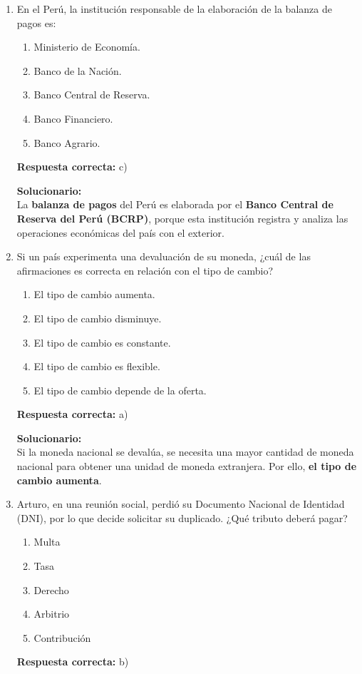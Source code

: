 \begin{enumerate}
	
	\item En el Perú, la institución responsable de la elaboración de la balanza de pagos es:
	\begin{enumerate}[label=\alph*)]
		\item Ministerio de Economía.
		\item Banco de la Nación.
		\item Banco Central de Reserva.
		\item Banco Financiero.
		\item Banco Agrario.
	\end{enumerate}
	\textbf{Respuesta correcta:} c)
	
	\vspace{2mm}
	\textbf{Solucionario:}\\
	La \textbf{balanza de pagos} del Perú es elaborada por el \textbf{Banco Central de Reserva del Perú (BCRP)}, porque esta institución registra y analiza las operaciones económicas del país con el exterior.
	
	\vspace{6mm}
	
	\item Si un país experimenta una devaluación de su moneda, ¿cuál de las afirmaciones es correcta en relación con el tipo de cambio?
	\begin{enumerate}[label=\alph*)]
		\item El tipo de cambio aumenta.
		\item El tipo de cambio disminuye.
		\item El tipo de cambio es constante.
		\item El tipo de cambio es flexible.
		\item El tipo de cambio depende de la oferta.
	\end{enumerate}
	\textbf{Respuesta correcta:} a)
	
	\vspace{2mm}
	\textbf{Solucionario:}\\
	Si la moneda nacional se devalúa, se necesita una mayor cantidad de moneda nacional para obtener una unidad de moneda extranjera. Por ello, \textbf{el tipo de cambio aumenta}.
	
	\vspace{6mm}
	
	\item Arturo, en una reunión social, perdió su Documento Nacional de Identidad (DNI), por lo que decide solicitar su duplicado. ¿Qué tributo deberá pagar?
	\begin{enumerate}[label=\alph*)]
		\item Multa
		\item Tasa
		\item Derecho
		\item Arbitrio
		\item Contribución
	\end{enumerate}
	\textbf{Respuesta correcta:} b)
	

\end{enumerate}
